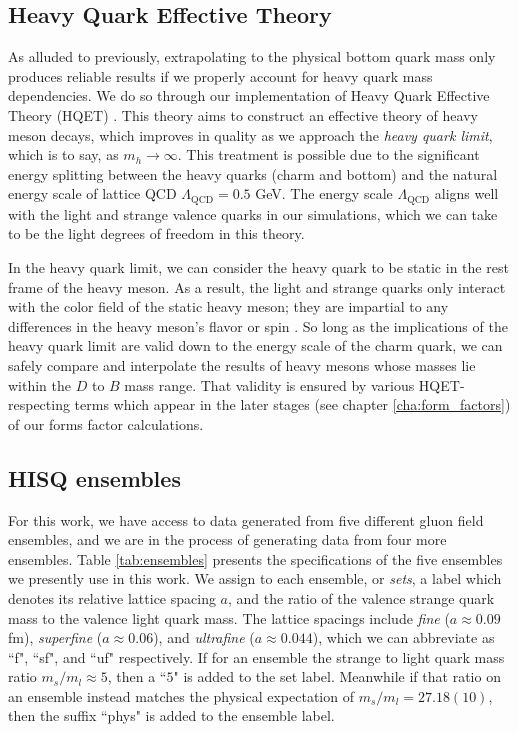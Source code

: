 \subsection{Heavy Quark Effective Theory}
As alluded to previously, extrapolating to the physical bottom quark mass only produces reliable results if we properly account for heavy quark mass dependencies.  We do so through our implementation of Heavy Quark Effective Theory (HQET) \cite{GEORGI1990447, EICHTEN1990511, neubert1996heavyquarkeffectivetheory}. 
This theory aims to construct an effective theory of heavy meson decays, which improves in quality as we approach the \textit{heavy quark limit}, which is to say, as $m_h \rightarrow \infty$.  This treatment is possible due to the significant energy splitting between the heavy quarks (charm and bottom) and the natural energy scale of lattice QCD $\Lambda_\mathrm{QCD} = 0.5$ GeV.  The energy scale $\Lambda_\mathrm{QCD}$ aligns well with the light and strange valence quarks in our simulations, which we can take to be the light degrees of freedom in this theory. 

In the heavy quark limit, we can consider the heavy quark to be static in the rest frame of the heavy meson.  As a result, the light and strange quarks only interact with the color field of the static heavy meson; they are impartial to any differences in the heavy meson's flavor or spin \cite{NEUBERT_2006}.  So long as the implications of the heavy quark limit are valid down to the energy scale of the charm quark, we can safely compare and interpolate the results of heavy mesons whose masses lie within the $D$ to $B$ mass range.  That validity is ensured by various HQET-respecting terms which appear in the later stages (see chapter \ref{cha:form_factors}) of our forms factor calculations.

\subsection{HISQ ensembles}\label{sec:HISQ_ensembles}
For this work, we have access to data generated from five different gluon field ensembles, and we are in the process of generating data from four more ensembles.  Table \ref{tab:ensembles} presents the specifications of the five ensembles we presently use in this work.  We assign to each ensemble, or \textit{sets}, a label which denotes its relative lattice spacing $a$, and the ratio of the valence strange quark mass to the valence light quark mass. The lattice spacings include \textit{fine} ($a\approx 0.09$fm), \textit{superfine} ($a\approx 0.06$), and \textit{ultrafine} ($a\approx 0.044$), which we can abbreviate as ``f", ``sf", and ``uf" respectively. If for an ensemble the strange to light quark mass ratio $m_s/m_l \approx 5$, then a ``$5$" is added to the set label.  Meanwhile if that ratio on an ensemble instead matches the physical expectation \cite{PhysRevD.98.074512} of $m_s/m_l = 27.18(10)$, then the suffix ``phys" is added to the ensemble label.

